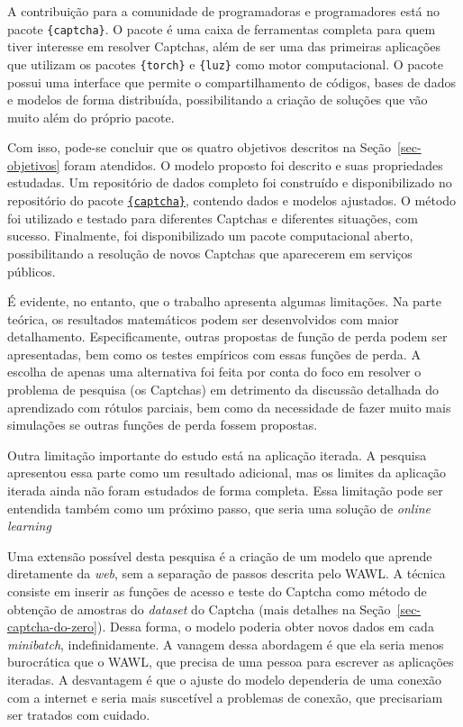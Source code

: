 \documentclass[12pt,twoside,brazilian]{book}
\begin{document}
A contribuição para a comunidade de programadoras e programadores está
no pacote \texttt{\{captcha\}}. O pacote é uma caixa de ferramentas
completa para quem tiver interesse em resolver Captchas, além de ser uma
das primeiras aplicações que utilizam os pacotes \texttt{\{torch\}} e
\texttt{\{luz\}} como motor computacional. O pacote possui uma interface
que permite o compartilhamento de códigos, bases de dados e modelos de
forma distribuída, possibilitando a criação de soluções que vão muito
além do próprio pacote.

Com isso, pode-se concluir que os quatro objetivos descritos na
Seção~\ref{sec-objetivos} foram atendidos. O modelo proposto foi
descrito e suas propriedades estudadas. Um repositório de dados completo
foi construído e disponibilizado no repositório do pacote
\href{https://github.com/decryptr/captcha/releases}{\texttt{\{captcha\}}},
contendo dados e modelos ajustados. O método foi utilizado e testado
para diferentes Captchas e diferentes situações, com sucesso.
Finalmente, foi disponibilizado um pacote computacional aberto,
possibilitando a resolução de novos Captchas que aparecerem em serviços
públicos.

É evidente, no entanto, que o trabalho apresenta algumas limitações. Na
parte teórica, os resultados matemáticos podem ser desenvolvidos com
maior detalhamento. Especificamente, outras propostas de função de perda
podem ser apresentadas, bem como os testes empíricos com essas funções
de perda. A escolha de apenas uma alternativa foi feita por conta do
foco em resolver o problema de pesquisa (os Captchas) em detrimento da
discussão detalhada do aprendizado com rótulos parciais, bem como da
necessidade de fazer muito mais simulações se outras funções de perda
fossem propostas.

Outra limitação importante do estudo está na aplicação iterada. A
pesquisa apresentou essa parte como um resultado adicional, mas os
limites da aplicação iterada ainda não foram estudados de forma
completa. Essa limitação pode ser entendida também como um próximo
passo, que seria uma solução de \emph{online learning}

Uma extensão possível desta pesquisa é a criação de um modelo que
aprende diretamente da \emph{web}, sem a separação de passos descrita
pelo WAWL. A técnica consiste em inserir as funções de acesso e teste do
Captcha como método de obtenção de amostras do \emph{dataset} do Captcha
(mais detalhes na Seção~\ref{sec-captcha-do-zero}). Dessa forma, o
modelo poderia obter novos dados em cada \emph{minibatch},
indefinidamente. A vanagem dessa abordagem é que ela seria menos
burocrática que o WAWL, que precisa de uma pessoa para escrever as
aplicações iteradas. A desvantagem é que o ajuste do modelo dependeria
de uma conexão com a internet e seria mais suscetível a problemas de
conexão, que precisariam ser tratados com cuidado.
\end{document}
